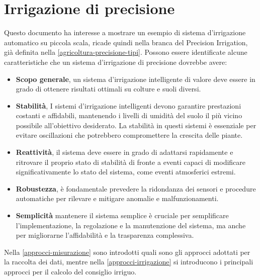 \documentclass[12pt,a4paper,openright,twoside, openany]{book}
\begin{document}
\section{Irrigazione di precisione}
\label{irrigazione-di-precisione}

Questo documento ha interesse a mostrare un esempio di sistema d'irrigazione automatico su piccola scala, ricade quindi nella branca del Precision Irrigation, già definita nella \cref{agricoltura-precisione-tipi}.
Possono essere identificate alcune caratteristiche che un sistema d'irrigazione di precisione dovrebbe avere:
\begin{itemize}
    \item \textbf{Scopo generale}, un sistema d'irrigazione intelligente di valore deve essere in grado di ottenere risultati ottimali su colture e suoli diversi.
    \item \textbf{Stabilità}, I sistemi d'irrigazione intelligenti devono garantire prestazioni costanti e affidabili, mantenendo i livelli di umidità del suolo il più vicino possibile all'obiettivo desiderato. La stabilità in questi sistemi è essenziale per evitare oscillazioni che potrebbero compromettere la crescita delle piante.
    \item \textbf{Reattività}, il sistema deve essere in grado di adattarsi rapidamente e ritrovare il proprio stato di stabilità di fronte a eventi capaci di modificare significativamente lo stato del sistema, come eventi atmosferici estremi.
    \item \textbf{Robustezza}, è fondamentale prevedere la ridondanza dei sensori e procedure automatiche per rilevare e mitigare anomalie e malfunzionamenti.
    \item \textbf{Semplicità} mantenere il sistema semplice è cruciale per semplificare l'implementazione, la regolazione e la manutenzione del sistema, ma anche per migliorarne l'affidabilità e la trasparenza complessiva.
\end{itemize}

Nella \cref{approcci-misurazione} sono introdotti quali sono gli approcci adottati per la raccolta dei dati, mentre nella \cref{approcci-irrigazione} si introducono i principali approcci per il calcolo del consiglio irriguo.

\end{document}

